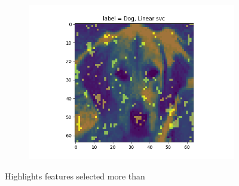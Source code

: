 \documentclass{article}
\begin{document}
\begin{figure}[H]
\begin{subfigure}{.33\textwidth}
  \label{fig:sub-second}
\end{subfigure}
\begin{subfigure}{.33\textwidth}
  \centering
  \includegraphics[width=1\linewidth]{2c/Imp feat SVM.png}  
  
  \label{fig:sub-second}
\end{subfigure}
\caption{Highlights features selected more than  }
\label{feet pics}
\end{figure}
\end{document}
